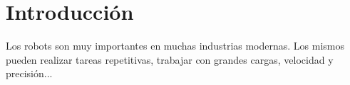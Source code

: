 \chapter*{Introducción}

Los robots son muy importantes en muchas industrias modernas. Los mismos pueden realizar tareas repetitivas, trabajar con grandes cargas, velocidad y precisión...
